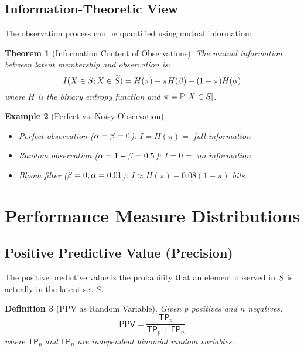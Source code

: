 \documentclass[11pt,final,hidelinks]{article}
\newtheorem{theorem}{Theorem}[section]
\newtheorem{definition}[theorem]{Definition}
\newtheorem{example}[theorem]{Example}
\newcommand{\FP}{\mathsf{FP}}  %
\newcommand{\TP}{\mathsf{TP}}  %
\newcommand{\PPV}{\mathsf{PPV}}  %
\begin{document}
\subsection{Information-Theoretic View}

The observation process can be quantified using mutual information:

\begin{theorem}[Information Content of Observations]
The mutual information between latent membership and observation is:
\begin{equation}
I(X \in S; X \in \widetilde{S}) = H(\pi) - \pi H(\beta) - (1-\pi)H(\alpha)
\end{equation}
where $H$ is the binary entropy function and $\pi = \mathbb{P}\left[X \in S\right]$.
\end{theorem}

\begin{example}[Perfect vs. Noisy Observation]
\begin{itemize}
    \item Perfect observation ($\alpha = \beta = 0$): $I = H(\pi) = $ full information
    \item Random observation ($\alpha = 1-\beta = 0.5$): $I = 0 = $ no information
    \item Bloom filter ($\beta = 0, \alpha = 0.01$): $I \approx H(\pi) - 0.08(1-\pi)$ bits
\end{itemize}
\end{example}

\section{Performance Measure Distributions}

\subsection{Positive Predictive Value (Precision)}

The positive predictive value is the probability that an element observed in $\widetilde{S}$ is actually in the latent set $S$.

\begin{definition}[PPV as Random Variable]
Given $p$ positives and $n$ negatives:
\begin{equation}
\PPV = \frac{\TP_p}{\TP_p + \FP_n}
\end{equation}
where $\TP_p$ and $\FP_n$ are independent binomial random variables.
\end{definition}
\end{document}
